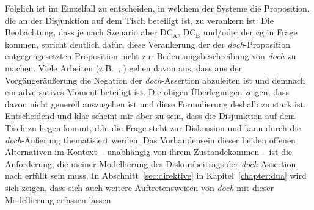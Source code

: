 Folglich ist im Einzelfall zu entscheiden, in welchem der Systeme die Proposition, die an der Disjunktion auf dem Tisch beteiligt ist, zu verankern ist. Die Beobachtung, dass je nach Szenario aber DC$_{\textrm{A}}$, DC$_\textrm{B}$ und/oder der cg in Frage kommen, spricht deutlich dafür, diese Verankerung der der \textit{doch}-Proposition entgegengesetzten Proposition nicht zur Bedeutungsbeschreibung von \textit{doch} zu machen. Viele Arbeiten (z.B.\ \citealt[71]{Doherty1985}, \citealt[83]{Ormelius-Sandblom1997}) gehen davon aus, dass aus der Vorgängeräußerung die Negation der \textit{doch}-Asser\-tion abzuleiten ist und demnach ein adversatives Moment beteiligt ist. Die obigen Überlegungen zeigen, dass davon nicht generell auszugehen ist und diese Formulierung deshalb zu stark ist. Entscheidend und klar scheint mir aber zu sein, dass die Disjunktion auf dem Tisch zu liegen kommt, d.h. die Frage steht zur Diskussion und kann durch die \textit{doch}-Äußerung thematisiert werden. Das Vorhandensein dieser beiden offenen Alternativen im Kontext – unabhängig von ihrem Zustandekommen – ist die Anforderung, die meiner Modellierung des Diskursbeitrags der \textit{doch}-Assertion nach erfüllt sein muss. In Abschnitt~\ref{sec:direktive} in Kapitel~\ref{chapter:dua} wird sich zeigen, dass sich auch weitere Auftretensweisen von \textit{doch} mit dieser Modellierung erfassen lassen.


